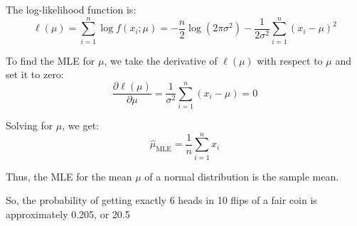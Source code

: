 \documentclass{article}
\begin{document}
The log-likelihood function is:
\[
\ell(\mu) = \sum_{i=1}^{n} \log f(x_i; \mu) = -\frac{n}{2} \log(2\pi\sigma^2) - \frac{1}{2\sigma^2} \sum_{i=1}^{n} (x_i - \mu)^2
\]

To find the MLE for \(\mu\), we take the derivative of \(\ell(\mu)\) with respect to \(\mu\) and set it to zero:
\[
\frac{\partial \ell(\mu)}{\partial \mu} = \frac{1}{\sigma^2} \sum_{i=1}^{n} (x_i - \mu) = 0
\]

Solving for \(\mu\), we get:
\[
\hat{\mu}_{\text{MLE}} = \frac{1}{n} \sum_{i=1}^{n} x_i
\]

Thus, the MLE for the mean \(\mu\) of a normal distribution is the sample mean.

So, the probability of getting exactly 6 heads in 10 flips of a fair coin is approximately 0.205, or 20.5%
\end{document}
